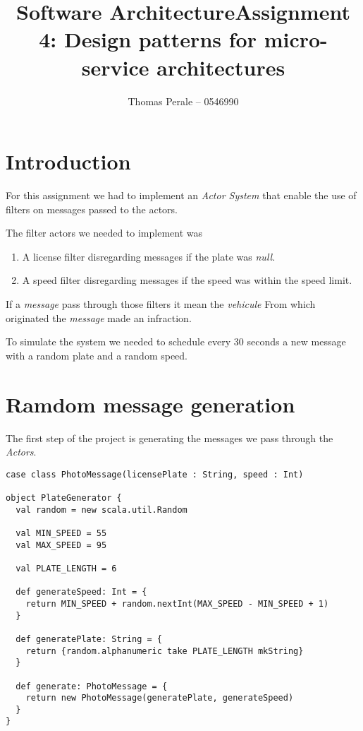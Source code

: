 \documentclass[a4paper,11pt]{article}
\begin{document}
\title{Software Architecture}
\title{Assignment 4: Design patterns for micro-service architectures}
\author{Thomas Perale -- 0546990}

\maketitle

\section{Introduction}

For this assignment we had to implement an \emph{Actor System} that
enable the use of filters on messages passed to the actors.

The filter actors we needed to implement was

\begin{enumerate}
  \item A license filter disregarding messages if the plate was \emph{null}.
  \item A speed filter disregarding messages if the speed was within the speed limit.
\end{enumerate}

If a \emph{message} pass through those filters it mean the \emph{vehicule} From
which originated the \emph{message} made an infraction.

To simulate the system we needed to schedule every 30 seconds a new message
with a random plate and a random speed.

\section{Ramdom message generation}

The first step of the project is generating the messages we pass through the
\emph{Actors}.

\begin{lstlisting}[style=scala]
case class PhotoMessage(licensePlate : String, speed : Int)

object PlateGenerator {
  val random = new scala.util.Random

  val MIN_SPEED = 55
  val MAX_SPEED = 95

  val PLATE_LENGTH = 6

  def generateSpeed: Int = {
    return MIN_SPEED + random.nextInt(MAX_SPEED - MIN_SPEED + 1)
  }

  def generatePlate: String = {
    return {random.alphanumeric take PLATE_LENGTH mkString}
  }

  def generate: PhotoMessage = {
    return new PhotoMessage(generatePlate, generateSpeed)
  }
}
\end{lstlisting}
\end{document}
